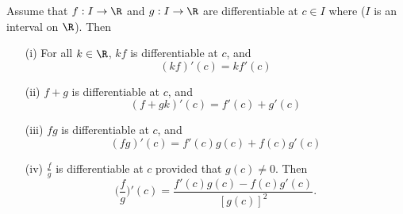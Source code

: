 \begin{theorem}
    Assume that \( f: I \to \R  \) and \( g : I \to \R  \) are differentiable at \( c \in I  \) where (\( I  \) is an interval on \( \R  \)). Then
    \begin{enumerate}
        \item[(i)] For all \( k \in \R  \), \( kf  \) is differentiable at \( c  \), and
            \[  (kf)'(c) = k f'(c) \]
        \item[(ii)] \( f+ g  \) is differentiable at \( c  \), and 
            \[  (f+gk)'(c) = f'(c) + g'(c) \]
        \item[(iii)] \( fg  \) is differentiable at \( c  \), and 
            \[  (fg)'(c) = f'(c) g(c) + f(c) g'(c) \]
        \item[(iv)] \( \frac{ f }{ g }  \) is differentiable at \( c  \) provided that \( g(c) \neq 0  \). Then
            \[  \Big(  \frac{ f }{ g }  \Big)' (c) = \frac{ f'(c) g(c) - f(c) g'(c) }{ [g(c)]^{2} }. \]
    \end{enumerate} 
\end{theorem}


% 

